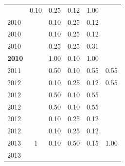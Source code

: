 \begin{table}[H]
\begin{tabular}{| l | c | c | c | c | c |}
          &
          0.10
          &
          0.25
          &
          0.12
          &
            {\color{blue} 1.00}
          \\
            2010
          &
          
          &
          0.10
          &
          0.25
          &
          0.12
          &
          \\
            2010
          &
          
          &
          0.10
          &
          0.25
          &
          0.12
          &
          \\
            2010
          &
          
          &
          0.25
          &
          0.25
          &
          0.31
          &
          \\
            {\bf 2010}
          &
          
          &
          1.00
          &
          0.10
          &
          1.00
          &
          \\
\hline
            2011
          &
          
          &
          0.50
          &
          0.10
          &
          0.55
          &
            {\color{blue} 0.55}
          \\
\hline
            2012
          &
          
          &
          0.10
          &
          0.25
          &
          0.12
          &
            {\color{blue} 0.55}
          \\
            2012
          &
          
          &
          0.50
          &
          0.10
          &
          0.55
          &
          \\
            2012
          &
          
          &
          0.50
          &
          0.10
          &
          0.55
          &
          \\
            2012
          &
          
          &
          0.10
          &
          0.25
          &
          0.12
          &
          \\
            2012
          &
          
          &
          0.10
          &
          0.25
          &
          0.12
          &
          \\
\hline
            2013
          &
          1
          &
          0.10
          &
          0.50
          &
          0.15
          &
            {\color{blue} 1.00}
          \\
            2013
          &
          

\end{tabular}
\end{table}
